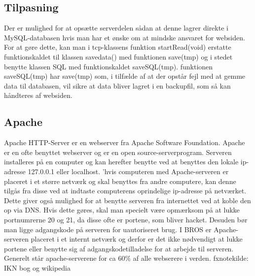 \subsection{Tilpasning}
Der er mulighed for at opsætte serverdelen sådan at denne lagrer direkte i MySQL-databasen hvis man har et ønske om at mindske ansvaret for websiden. For at gøre dette, kan man i tcp-klassens funktion startRead(void) erstatte funktionskaldet til klassen savedata() med funktionen save(tmp) og i stedet benytte klassen SQL med funktionskaldet saveSQL(tmp). funktionen saveSQL(tmp) har save(tmp) som, i tilfælde af at der opstår fejl med at gemme data til databasen, vil sikre at data bliver lagret i en backupfil, som så kan håndteres af websiden.

\subsection{Apache}
Apache HTTP-Server er en webserver fra Apache Software Foundation. Apache er en ofte benyttet webserver og er en open source-serverprogram. Serveren installeres på en computer og kan herefter benytte ved at benyttes den lokale ip-adresse 127.0.0.1 eller localhost. 'hvis computeren med Apache-serveren er placeret i et større netværk og skal benyttes fra andre computere, kan denne tilgås fra disse ved at indtaste computerens oprindelige ip-adresse på netværket. Dette giver også mulighed for at benytte serveren fra internettet ved at koble den op via DNS. Hvis dette gøres, skal man specielt være opmærksom på at lukke portnumrerne 20 og 21, da disse ofte er portene, som bliver hacket. Desuden bør man ligge adgangskode på serveren for uautoriseret brug. I BROS er Apache-serveren placeret i et internt netværk og derfor er det ikke nødvendigt at lukke portene eller benytte sig af adgangskodetilladelse for at arbejde til serveren.
Generelt står apache-serverene for ca 60\% af alle webserere i verden.
fxnote{kilde: IKN bog og wikipedia} 


